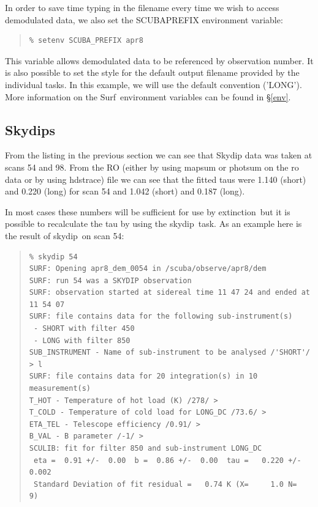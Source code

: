 \documentclass[twoside,11pt]{article}
\newcommand{\scusoft}          {{\sc Surf}}
\newcommand{\task}[1]{{\sf #1}}
\newcommand{\skydip}{\htmlref{\task{skydip}}{SKYDIP}}
\newcommand{\ext}{\htmlref{\task{extinction}}{EXTINCTION}}
\newcommand{\hdstrace}{\xref{\task{hdstrace}}{sun102}{}}
\newenvironment{myquote}{\begin{quote}\begin{small}}{\end{small}\end{quote}}
\newcommand{\htmlref}[2]{#1}
\newcommand{\xref}[3]{#1}
\renewcommand{\_}{\texttt{\symbol{95}}}
\begin{document}
In order to save time typing in the filename every time we wish to access 
demodulated data, we also set the SCUBA\_PREFIX environment variable:

\begin{myquote}
\begin{verbatim}
% setenv SCUBA_PREFIX apr8
\end{verbatim}
\end{myquote}

This variable allows demodulated data to be referenced by observation number.
It is also possible to set the style for the default output filename provided
by the individual tasks. In this example, we will use the default convention
('LONG'). More information on the \scusoft\ environment variables can be found 
in \S\ref{env}.



\subsection{Skydips}

From the listing in the previous section we can see that Skydip data 
was taken at scans 54 and 98. From the RO (either by using mapsum or
photsum on the ro data or by using \hdstrace) file we can see that the 
fitted taus were 1.140 (short) and 0.220 (long) for scan 54 and 1.042 (short)
and 0.187 (long).

In most cases these numbers will be sufficient for use by \ext\ but
it is possible to recalculate the tau by using the \skydip\ task. As an
example here is the result of \skydip\ on scan 54:

\begin{myquote}
\begin{verbatim}
% skydip 54
SURF: Opening apr8_dem_0054 in /scuba/observe/apr8/dem
SURF: run 54 was a SKYDIP observation
SURF: observation started at sidereal time 11 47 24 and ended at 11 54 07
SURF: file contains data for the following sub-instrument(s)
 - SHORT with filter 450
 - LONG with filter 850
SUB_INSTRUMENT - Name of sub-instrument to be analysed /'SHORT'/ > l
SURF: file contains data for 20 integration(s) in 10 measurement(s)
T_HOT - Temperature of hot load (K) /278/ > 
T_COLD - Temperature of cold load for LONG_DC /73.6/ > 
ETA_TEL - Telescope efficiency /0.91/ >
B_VAL - B parameter /-1/ > 
SCULIB: fit for filter 850 and sub-instrument LONG_DC
 eta =  0.91 +/-  0.00  b =  0.86 +/-  0.00  tau =   0.220 +/- 0.002
 Standard Deviation of fit residual =   0.74 K (X=     1.0 N=    9)
\end{verbatim}
\end{myquote}
\end{document}
